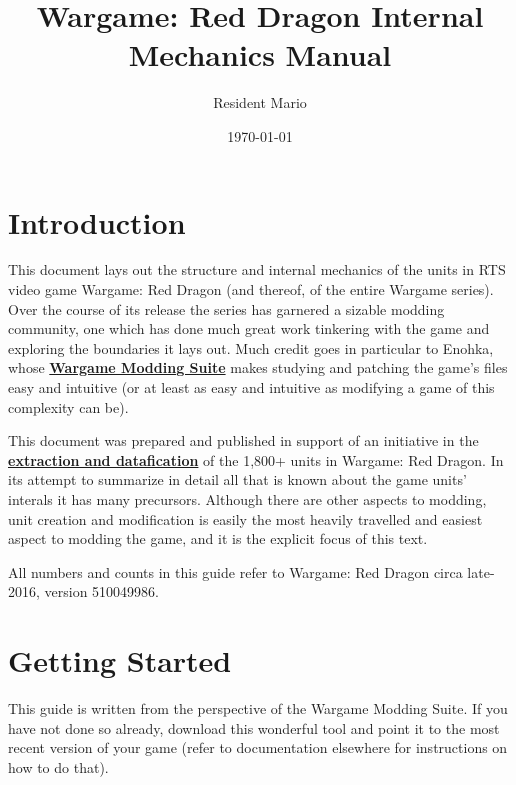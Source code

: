 \documentclass{article}
\begin{document}
\newcommand{\link}[2]{\textbf{\href{#1}{#2}}}

\title{Wargame: Red Dragon Internal Mechanics Manual}
\date{\today}
\author{Resident Mario}
\maketitle

\newpage
\tableofcontents
\newpage

\section{Introduction}

This document lays out the structure and internal mechanics of the units in RTS video game Wargame: Red Dragon (and thereof, of the entire Wargame series). Over the course of its release the series has garnered a sizable modding community, one which has done much great work tinkering with the game and exploring the boundaries it lays out. Much credit goes in particular to Enohka, whose \link{https://github.com/enohka/moddingSuite}{Wargame Modding Suite} makes studying and patching the game's files  easy and intuitive (or at least as easy and intuitive as modifying a game of this complexity can be).

This document was prepared and published in support of an initiative in the \link{https://github.com/ResidentMario/wargame-data}{extraction and datafication} of the 1,800+ units in Wargame: Red Dragon. In its attempt to summarize in detail all that is known about the game units' interals it has many precursors. Although there are other aspects to modding, unit creation and modification is easily the most heavily travelled and easiest aspect to modding the game, and it is the explicit focus of this text.

All numbers and counts in this guide refer to Wargame: Red Dragon circa late-2016, version 510049986.

\newpage

\section{Getting Started}

This guide is written from the perspective of the Wargame Modding Suite. If you have not done so already, download this wonderful tool and point it to the most recent version of your game (refer to documentation elsewhere for instructions on how to do that).
\end{document}
